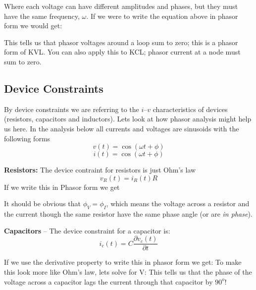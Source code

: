 \documentclass{handout}
\begin{document}
Where each voltage can have different amplitudes and phases, but they must have the same frequency, $\omega$.  If we were to write the equation above in phasor form we would get:

\soln{1in}{
\[
V_1\angle \phi_1+V_2\angle \phi_2+V_3\angle \phi_3+..... = 0
\]
}
This tells us that phasor voltages around a loop sum to zero; this is a phasor form of KVL.  You can also apply this to KCL; phasor current at a node must sum to zero.

\subsection{Device Constraints}
By device constraints we are referring to the $i$--$v$ characteristics of devices (resistors, capacitors and inductors).  Lets look at how phasor analysis might help us here. In the analysis below all currents and voltages are sinusoids with the following forms
\[
v(t) = \cos(\omega t +\phi)
\]
\[
i(t) = \cos (\omega t +\phi)
\]


\textbf{Resistors:}  The device contraint for resistors is just Ohm's law
\[
v_R(t) = i_R(t)R
\]
If we write this in Phasor form we get
\soln{1in}{
\[
V_R\angle \phi_V = I_R\angle \phi_I \times R
\]
}

It should be obvious that $\phi_V = \phi_I$, which means the voltage across a resistor and the current though the same resistor have the same phase angle (or are {\em in phase}).

\textbf{Capacitors} -- The device constraint for a capacitor is:
\[
i_c(t) = C\frac{\partial v_c(t)}{\partial t}
\]

If we use the derivative property to write this in phasor form we get:
\soln{2in}{
\[
I_c\angle \phi_I =  j\omega C V_c \angle \phi_V
\]
}
To make this look more like Ohm's law, lets solve for V:
This tells us that the phase of the voltage across a capacitor lags the current through that capacitor by $90^o$!
\end{document}
